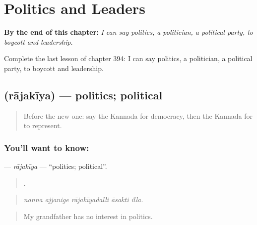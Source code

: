 
\chapter{Politics and Leaders}
\label{ch:ka-politics-and-leaders}

\begin{chapteropening}
\textbf{By the end of this chapter:} \emph{I can say politics, a politician, a political party, to boycott and leadership.}

Complete the last lesson of chapter 394: I can say politics, a politician, a political party, to boycott and leadership.
\end{chapteropening}

\section[\texorpdfstring{\kn{ರಾಜಕೀಯ} (rājakīya)}{ರಾಜಕೀಯ (rājakīya)}]{ (rājakīya) — politics; political}

\label{lesson:KA-C394-rajakiya}



\begin{quote}
Before the new one: say the Kannada for democracy, then the Kannada for to represent.
\end{quote}

\subsection*{You'll want to know: }
\textbf{} — \emph{rājakīya} — \textquotedblleft{}politics; political\textquotedblright{}.

\begin{quote}
    .
\end{quote}

\begin{quote}
\emph{nanna ajjanige rājakīyadalli āsakti illa.}
\end{quote}

\begin{quote}
My grandfather has no interest in politics.
\end{quote}


